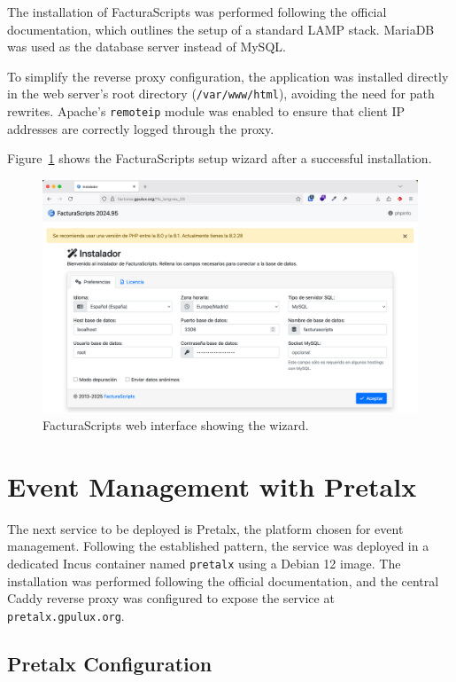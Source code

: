The installation of FacturaScripts was performed following the official documentation\cite{facturascripts-install-linux}, which outlines the setup of a standard LAMP stack. MariaDB was used as the database server instead of MySQL.

To simplify the reverse proxy configuration, the application was installed directly in the web server's root directory (\texttt{/var/www/html}), avoiding the need for path rewrites. Apache's \texttt{remoteip} module was enabled to ensure that client IP addresses are correctly logged through the proxy.

Figure~\ref{fig:facturascripts-wizard} shows the FacturaScripts setup wizard after a successful installation.

\begin{figure}[H]
	\centering
	\includegraphics[width=\textwidth]{imaxes/facturascripts-wizard.png}
	\caption{FacturaScripts web interface showing the wizard.}
	\label{fig:facturascripts-wizard}
\end{figure}

\section{Event Management with Pretalx}

The next service to be deployed is Pretalx, the platform chosen for event management. Following the established pattern, the service was deployed in a dedicated Incus container named \texttt{pretalx} using a Debian 12 image. The installation was performed following the official documentation\cite{pretalx-intstall}, and the central Caddy reverse proxy was configured to expose the service at \texttt{pretalx.gpulux.org}.

\subsection*{Pretalx Configuration}

